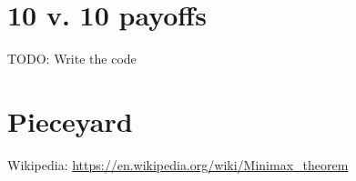 \documentclass[11pt, oneside]{article} 	%
\begin{document}
\section{10 v. 10 payoffs}

TODO: Write the code

\section{Pieceyard}


\begin{thebibliography}{9}
Wikipedia: \url{https://en.wikipedia.org/wiki/Minimax_theorem}
\end{thebibliography}
\end{document}
